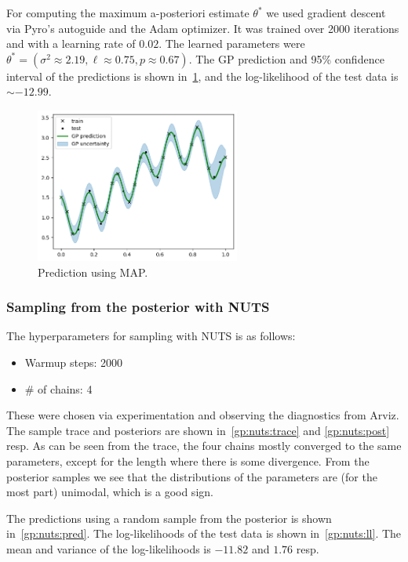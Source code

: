 For computing the maximum a-posteriori estimate $\theta^\ast$
we used gradient descent via Pyro's autoguide and the Adam optimizer.
It was trained over 2000 iterations and with a learning rate of $0.02$.
The learned parameters were
$\theta^\ast = (\sigma^2 \approx 2.19, \ell \approx 0.75, p \approx 0.67)$.
The GP prediction and 95\% confidence interval of the predictions
is shown in~\cref{gp:map:pred},
and the log-likelihood of the test data is $\sim -12.99$.

\begin{figure}[htbp]
  \centering
  \includegraphics[width=0.6\textwidth]{./figures/map_pred.png}
  \caption{
    Prediction using MAP.
  }
  \label{gp:map:pred}
\end{figure}

\subsubsection{Sampling from the posterior with NUTS}

The hyperparameters for sampling with NUTS is as follows:
\begin{itemize}
  \item Warmup steps: 2000
  \item \# of chains: 4
\end{itemize}
These were chosen via experimentation and observing the diagnostics
from Arviz. The sample trace and posteriors are shown in~\cref{gp:nuts:trace} and \cref{gp:nuts:post} resp.
As can be seen from the trace, the four chains mostly converged to the same parameters,
except for the length where there is some divergence.
From the posterior samples we see that the distributions of the parameters
are (for the most part) unimodal, which is a good sign.

The predictions using a random sample from the posterior is shown in~\cref{gp:nuts:pred}.
The log-likelihoods of the test data is shown in~\cref{gp:nuts:ll}.
The mean and variance of the log-likelihoods is $-11.82$ and $1.76$ resp.

